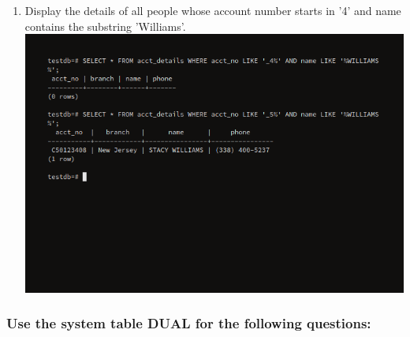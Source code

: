 \documentclass[10pt,a4paper,titlepage]{report}
\begin{document}
{\begin{enumerate}
	\item Display the details of all people whose account number starts in '4' and name contains the substring 'Williams'.\newline
	\includegraphics[width=\linewidth]{../Images/Strings/13.png}
\end{enumerate}

\subsubsection{Use the system table DUAL for the following questions:}

}
\end{document}
